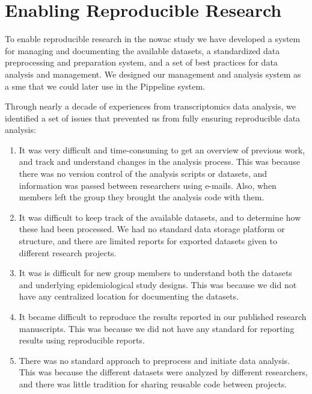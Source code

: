 \section{Enabling Reproducible Research} 
To enable reproducible research in the \gls{nowac} study we have developed a
system for managing and documenting the available datasets, a standardized data
preprocessing and preparation system, and a set of best practices for data
analysis and management. We designed our management and analysis system as a
\gls{sme} that we could later use in the Pippeline system. 

Through nearly a decade of experiences from transcriptomics data analysis, we
identified a set of issues that prevented us from fully ensuring reproducible
data analysis: 
\begin{enumerate} 
    \item 
        It was very difficult and time-consuming to get an overview of previous
        work, and track and understand changes in the analysis process. This was
        because there was no version control of the analysis scripts or
        datasets, and information was passed between researchers using e-mails.
        Also, when members left the group they brought the analysis code with
        them. 
    
    \item It was difficult to keep track of the available datasets, and to
        determine how these had been processed. We had no standard data storage
        platform or structure, and there are limited reports for exported
        datasets given to different research projects.

    \item It was is difficult for new group members to understand both the
        datasets and underlying epidemiological study designs. This was because
        we did not have any centralized location for documenting the datasets.
    
    \item It became difficult to reproduce the results reported in our published
        research manuscripts. This was because we did not have any standard for
        reporting results using reproducible reports. 

    \item There was no standard approach to preprocess and initiate data
        analysis. This was because the different datasets were analyzed by
        different researchers, and there was little tradition for sharing
        reusable code between projects. 
        
\end{enumerate} 


